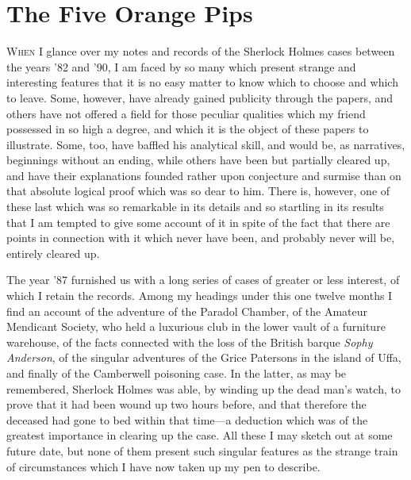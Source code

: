 \chapter{The Five Orange Pips}
\lettrine[lines=4]{W}{hen} I glance over my notes and records of the Sherlock Holmes cases between the years '82 and '90, I am faced by so many which present strange and interesting features that it is no easy matter to know which to choose and which to leave. Some, however, have already gained publicity through the papers, and others have not offered a field for those peculiar qualities which my friend possessed in so high a degree, and which it is the object of these papers to illustrate. Some, too, have baffled his analytical skill, and would be, as narratives, beginnings without an ending, while others have been but partially cleared up, and have their explanations founded rather upon conjecture and surmise than on that absolute logical proof which was so dear to him. There is, however, one of these last which was so remarkable in its details and so startling in its results that I am tempted to give some account of it in spite of the fact that there are points in connection with it which never have been, and probably never will be, entirely cleared up.

The year '87 furnished us with a long series of cases of greater or less interest, of which I retain the records. Among my headings under this one twelve months I find an account of the adventure of the Paradol Chamber, of the Amateur Mendicant Society, who held a luxurious club in the lower vault of a furniture warehouse, of the facts connected with the loss of the British barque \textit{Sophy Anderson}, of the singular adventures of the Grice Patersons in the island of Uffa, and finally of the Camberwell poisoning case. In the latter, as may be remembered, Sherlock Holmes was able, by winding up the dead man's watch, to prove that it had been wound up two hours before, and that therefore the deceased had gone to bed within that time—a deduction which was of the greatest importance in clearing up the case. All these I may sketch out at some future date, but none of them present such singular features as the strange train of circumstances which I have now taken up my pen to describe.

